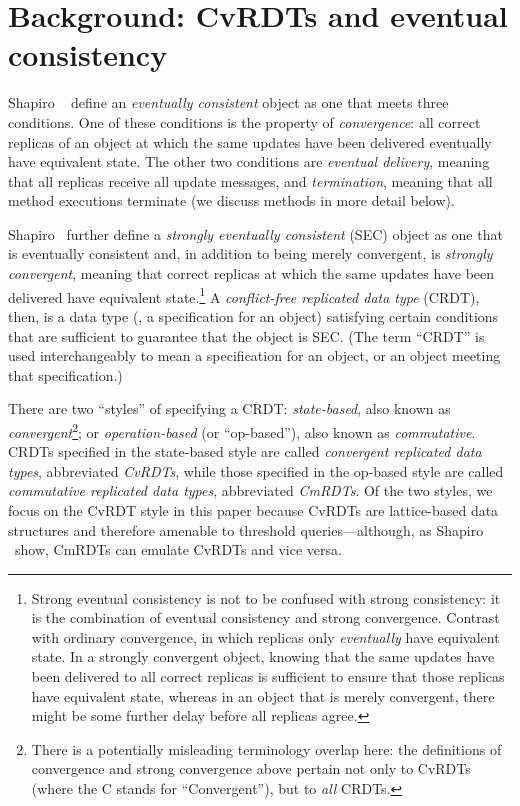 \section{Background: CvRDTs and eventual consistency}\label{s:distributed-cvrdts}

Shapiro \etal~\cite{crdts, crdts-tr} define an \emph{eventually
  consistent} object as one that meets three conditions.  One of these
conditions is the property of \emph{convergence}: all correct replicas
of an object at which the same updates have been delivered eventually
have equivalent state.  The other two conditions are \emph{eventual
  delivery}, meaning that all replicas receive all update messages,
and \emph{termination}, meaning that all method executions terminate
(we discuss methods in more detail below).

Shapiro \etal~further define a \emph{strongly eventually consistent}
(SEC) object as one that is eventually consistent and, in addition to
being merely convergent, is \emph{strongly convergent}, meaning that
correct replicas at which the same updates have been delivered have
equivalent state.\footnote{ Strong eventual consistency is not to be
  confused with strong consistency: it is the combination of eventual
  consistency and strong convergence.  Contrast with ordinary
  convergence, in which replicas only \emph{eventually} have
  equivalent state.  In a strongly convergent object, knowing that the
  same updates have been delivered to all correct replicas is
  sufficient to ensure that those replicas have equivalent state,
  whereas in an object that is merely convergent, there might be some
  further delay before all replicas agree.}  A \emph{conflict-free
  replicated data type} (CRDT), then, is a data type (\ie, a
specification for an object) satisfying certain conditions that are
sufficient to guarantee that the object is SEC.  (The term ``CRDT'' is
used interchangeably to mean a specification for an object, or an
object meeting that specification.)

There are two ``styles'' of specifying a CRDT: \emph{state-based},
also known as \emph{convergent}\footnote{There is a potentially
  misleading terminology overlap here: the definitions of convergence
  and strong convergence above pertain not only to CvRDTs (where the C
  stands for ``Convergent''), but to \emph{all} CRDTs.}; or
\emph{operation-based} (or ``op-based''), also known as
\emph{commutative}.  CRDTs specified in the state-based style are
called \emph{convergent replicated data types}, abbreviated
\emph{CvRDTs}, while those specified in the op-based style are called
\emph{commutative replicated data types}, abbreviated \emph{CmRDTs}.
Of the two styles, we focus on the CvRDT style in this paper because
CvRDTs are lattice-based data structures and therefore amenable to
threshold queries---although, as Shapiro \etal~show, CmRDTs can
emulate CvRDTs and vice versa.

